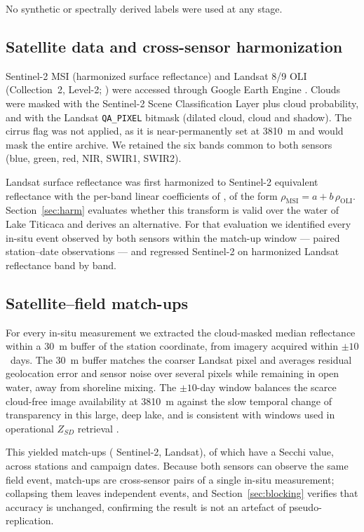 \documentclass[preprint,review,12pt,authoryear]{elsarticle}
\begin{document}
No synthetic or spectrally derived labels were used at any stage.



\subsection{Satellite data and cross-sensor harmonization}

Sentinel-2 MSI (harmonized surface reflectance) and Landsat 8/9 OLI
(Collection~2, Level-2; \citealp{Vermote2016}) were accessed through Google
Earth Engine \citep{Gorelick2017}. Clouds were masked with the Sentinel-2
Scene Classification Layer plus cloud probability, and with the Landsat
\texttt{QA\_PIXEL} bitmask (dilated cloud, cloud and shadow). The cirrus flag
was not applied, as it is near-permanently set at 3810~m and would mask the
entire archive. We retained the six bands common to both sensors (blue,
green, red, NIR, SWIR1, SWIR2).

Landsat surface reflectance was first harmonized to Sentinel-2 equivalent
reflectance with the per-band linear coefficients of \citet{Roy2016}, of the
form $\rho_{\mathrm{MSI}} = a + b\,\rho_{\mathrm{OLI}}$.
Section~\ref{sec:harm} evaluates whether this transform is valid over the
water of Lake Titicaca and derives an alternative. For that evaluation we
identified every in-situ event observed by both sensors within the match-up
window --- \numPairedEvents{} paired station--date observations --- and
regressed Sentinel-2 on harmonized Landsat reflectance band by band.

\subsection{Satellite--field match-ups}

For every in-situ measurement we extracted the cloud-masked median
reflectance within a 30~m buffer of the station coordinate, from imagery
acquired within $\pm10$~days. The 30~m buffer matches the coarser Landsat
pixel and averages residual geolocation error and sensor noise over several
pixels while remaining in open water, away from shoreline mixing. The
$\pm10$-day window balances the scarce cloud-free image availability at
3810~m against the slow temporal change of transparency in this large, deep
lake, and is consistent with windows used in operational $Z_{SD}$ retrieval
\citep{Kloiber2002,Zhang2022}.

This yielded \numMatchupsTotal{} match-ups (\numMatchupsSTwo{} Sentinel-2,
\numMatchupsLs{} Landsat), of which \numMatchupsSecchi{} have a Secchi value,
across \numStations{} stations and \numCampaigns{} campaign dates. Because
both sensors can observe the same field event, \numCrossSensorPairs{}
match-ups are cross-sensor pairs of a single in-situ measurement; collapsing
them leaves \numIndependentEvents{} independent events, and
Section~\ref{sec:blocking} verifies that accuracy is unchanged, confirming
the result is not an artefact of pseudo-replication.
\end{document}
